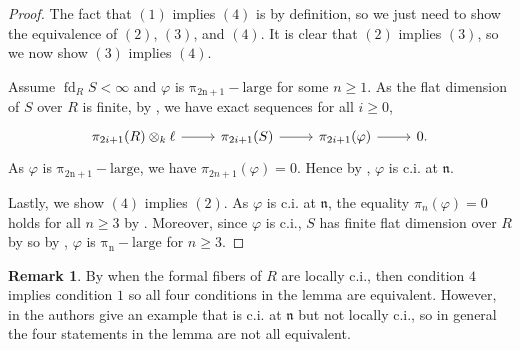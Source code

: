 \documentclass{amsart}
\theoremstyle{definition}
\newtheorem{remark}[theorem]{Remark}
\newcommand{\n}{\mathfrak{n}}
\newcommand{\fdim}[2]{\operatorname{fd}_{#1}#2}
\newcommand{\pil}[1]{\operatorname{\pi_{#1}-large}}
\begin{document}
\begin{proof}
The fact that $(1)$ implies $(4)$ is by definition, so we just need to show the equivalence of $(2)$, $(3)$, and $(4)$. It is clear that $(2)$ implies $(3)$, so we now show $(3)$ implies $(4)$.

Assume $\fdim{R}{S} < \infty$ and $\varphi$ is $\pil{2n+1}$ for some $n \geq 1$. As the flat dimension of $S$ over $R$ is finite, by , we have exact sequences for all $i \geq 0$,
\[
\begin{tikzcd}  
         \pi_{2i+1}(R) \otimes_k \ell \ar[r] & \pi_{2i+1}(S) \ar[r] & \pi_{2i+1}(\varphi) \ar[r] & 0.
    \end{tikzcd}
\]
As $\varphi$ is $\pil{2n+1}$, we have $\pi_{2n+1}(\varphi)=0$. Hence by \cite[Corollary 5.5]{Avramov/Iyengar:2003}, $\varphi$ is c.i. at $\n$.

Lastly, we show $(4)$ implies $(2)$. As $\varphi$ is c.i. at $\n$, the equality $\pi_n(\varphi)=0$ holds for all $n \geq 3$ by \cite[2.8]{Avramov/Iyengar:2003}. Moreover, since $\varphi$ is c.i., $S$ has finite flat dimension over $R$ by \cite[Lemma 3.2]{Avramov/Foxby/Herzog:1994} so by , $\varphi$ is $\pil{n}$ for $n \geq 3$.
\end{proof}


\begin{remark}
By \cite[Lemma 5.12.1]{Avramov:1999} when the formal fibers of $R$ are locally c.i., then condition $4$ implies condition $1$ so all four conditions in the lemma are equivalent. However, in \cite[Remarque 3.2.1]{Ferrand/Raynaud:1970} the authors give an example that is c.i. at $\n$ but not locally c.i., so in general the four statements in the lemma are not all equivalent.
\end{remark}





















\end{document}
